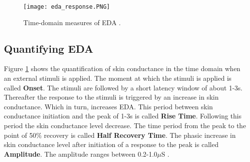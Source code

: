 \begin{figure}
    \centering
    \texttt{[image: eda\_response.PNG]}
    \caption{Time-domain measures of EDA \cite{cacioppo_electrodermal_2016_p_217_243}.}
    \label{fig:eda_graph}
\end{figure}

\subsection{Quantifying EDA}
\label{sec:quantify_eda}
Figure \ref{fig:eda_graph} shows the quantification of skin conductance in the time domain when an external stimuli is applied. The moment at which the stimuli is applied is called \textbf{Onset}. The stimuli are followed by a short latency window of about 1-3s. Thereafter the response to the stimuli is triggered by an increase in skin conductance. Which in turn, increases EDA. This period between skin conductance initiation and the peak of 1-3s is called \textbf{Rise Time}. Following this period the skin conductance level decrease. The time period from the peak to the point of 50$\%$ recovery is called \textbf{Half Recovery Time}. The phasic increase in skin conductance level after initiation of a response to the peak is called \textbf{Amplitude}. The amplitude ranges between 0.2-1.0$\mu$S \cite{cacioppo_electrodermal_2016_p_217_243}.

